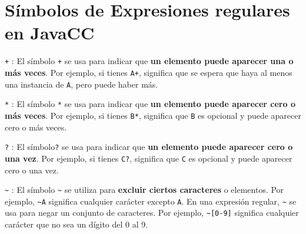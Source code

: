 \section{Símbolos de Expresiones regulares en JavaCC}
\label{sec:simbolosdeexpresionesregulares}
\lstinline[basicstyle=\large\ttfamily]|+| : El símbolo \lstinline[basicstyle=\large\ttfamily]|+| se usa para indicar que \textbf{un elemento puede aparecer una o más veces}. Por ejemplo, si tienes \lstinline[basicstyle=\large\ttfamily]|A+|, significa que se espera que haya al menos una instancia de \lstinline[basicstyle=\large\ttfamily]|A|, pero puede haber más.

\lstinline[basicstyle=\large\ttfamily]|*| : El símbolo \lstinline[basicstyle=\large\ttfamily]|*| se usa para indicar que \textbf{un elemento puede aparecer cero o más veces}. Por ejemplo, si tienes \lstinline[basicstyle=\large\ttfamily]|B*|, significa que \lstinline[basicstyle=\large\ttfamily]|B| es opcional y puede aparecer cero o más veces.

\lstinline[basicstyle=\large\ttfamily]|?| : El símbolo\lstinline[basicstyle=\large\ttfamily]|?| se usa para indicar que \textbf{un elemento puede aparecer cero o una vez}. Por ejemplo, si tienes \lstinline[basicstyle=\large\ttfamily]|C?|, significa que \lstinline[basicstyle=\large\ttfamily]|C| es opcional y puede aparecer cero o una vez.


\lstinline[basicstyle=\large\ttfamily]|~| : El símbolo \lstinline[basicstyle=\large\ttfamily]|~| se utiliza para \textbf{excluir ciertos caracteres} o elementos. Por ejemplo, \lstinline[basicstyle=\large\ttfamily]|~A| significa cualquier carácter excepto \lstinline[basicstyle=\large\ttfamily]|A|. En una expresión regular, \lstinline[basicstyle=\large\ttfamily]|~| se usa para negar un conjunto de caracteres. Por ejemplo, \lstinline[basicstyle=\large\ttfamily]|~[0-9]| significa cualquier carácter que no sea un dígito del 0 al 9.

